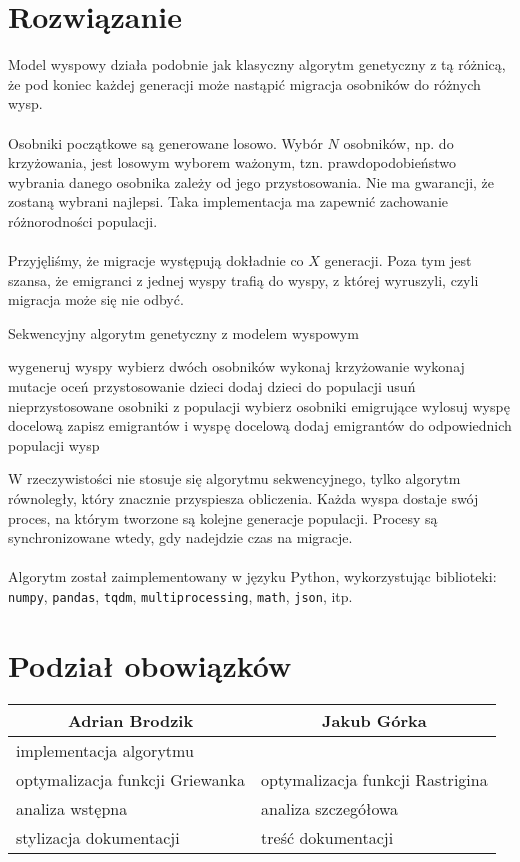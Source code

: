 \documentclass[12pt,a4paper]{article}
\begin{document}
\section*{Rozwiązanie}
Model wyspowy działa podobnie jak klasyczny algorytm genetyczny z tą różnicą, że pod koniec każdej generacji może nastąpić migracja osobników do różnych wysp.
\\
\\
Osobniki początkowe są generowane losowo. Wybór $N$ osobników, np. do krzyżowania, jest losowym wyborem ważonym, tzn. prawdopodobieństwo wybrania danego osobnika zależy od jego przystosowania. Nie ma gwarancji, że zostaną wybrani najlepsi. Taka implementacja ma zapewnić zachowanie różnorodności populacji.
\\
\\
Przyjęliśmy, że migracje występują dokładnie co $X$ generacji. Poza tym jest szansa, że emigranci z jednej wyspy trafią do wyspy, z której wyruszyli, czyli migracja może się nie odbyć.
\begin{algorithm}[H]
\caption{Sekwencyjny algorytm genetyczny z modelem wyspowym}
\begin{algorithmic}[1]
	\STATE wygeneruj wyspy
	\STATE
			\STATE wybierz dwóch osobników
			\STATE wykonaj krzyżowanie
			\STATE wykonaj mutacje
			\STATE oceń przystosowanie dzieci
			\STATE dodaj dzieci do populacji
			\STATE usuń nieprzystosowane osobniki z populacji
		\ENDFOR
		\STATE
			\STATE wybierz osobniki emigrujące
			\STATE wylosuj wyspę docelową
			\STATE zapisz emigrantów i wyspę docelową
			\ENDFOR
			\STATE
			\STATE dodaj emigrantów do odpowiednich populacji wysp
		\ENDIF
	\ENDWHILE
\end{algorithmic}
\end{algorithm}
\noindent
W rzeczywistości nie stosuje się algorytmu sekwencyjnego, tylko algorytm równoległy, który znacznie przyspiesza obliczenia. Każda wyspa dostaje swój proces, na którym tworzone są kolejne generacje populacji. Procesy są synchronizowane wtedy, gdy nadejdzie czas na migracje.
\\
\\
Algorytm został zaimplementowany w języku Python, wykorzystując biblioteki: \texttt{numpy}, \texttt{pandas}, \texttt{tqdm}, \texttt{multiprocessing}, \texttt{math}, \texttt{json}, itp.

\section*{Podział obowiązków}
\begin{table}[H]
	\centering
	\begin{tabular}{l|l}
		\multicolumn{1}{c|}{Adrian Brodzik} & \multicolumn{1}{c}{Jakub Górka} \\ \hline
		implementacja algorytmu & \\
		optymalizacja funkcji Griewanka & optymalizacja funkcji Rastrigina \\
		analiza wstępna & analiza szczegółowa \\
		stylizacja dokumentacji & treść dokumentacji              
	\end{tabular}
\end{table}
\end{document}
